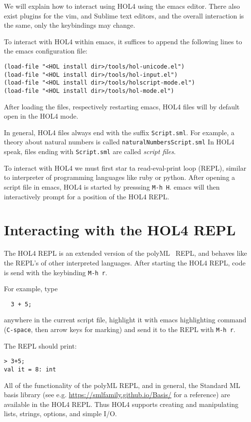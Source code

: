 \documentclass[10pt]{scrartcl}
\newcommand{\ekey}[1]{\texttt{#1}}
\begin{document}
We will explain how to interact using HOL4 using the emacs editor.
There also exist plugins for the vim, and Sublime text editors, and the overall
interaction is the same, only the keybindings may change.

To interact with HOL4 within emacs, it suffices to append the following lines to
the emacs configuration file:
\begin{lstlisting}
(load-file "<HOL install dir>/tools/hol-unicode.el")
(load-file "<HOL install dir>/tools/hol-input.el")
(load-file "<HOL install dir>/tools/holscript-mode.el")
(load-file "<HOL install dir>/tools/hol-mode.el")
\end{lstlisting}

After loading the files, respectively restarting emacs, HOL4 files will by
default open in the HOL4 mode.

In general, HOL4 files always end with the suffix \texttt{Script.sml}.
For example, a theory about natural numbers is called
\texttt{naturalNumbersScript.sml}
In HOL4 speak, files ending with \texttt{Script.sml} are called \emph{script files}.

To interact with HOL4 we must first star ta read-eval-print loop (REPL), similar
to interpreter of programming languages like ruby or python.
After opening a script file in emacs, HOL4 is started by presssing
\ekey{M-h H}.
emacs will then interactively prompt for a position of the HOL4 REPL.

\section{Interacting with the HOL4 REPL}

The HOL4 REPL is an extended version of the polyML~\cite{polymlweb} REPL, and
behaves like the REPL's of other interpreted languages.
After starting the HOL4 REPL, code is send with the keybinding \ekey{M-h r}.

For example, type
\begin{lstlisting}
  3 + 5;
\end{lstlisting}

anywhere in the current script file, highlight it with emacs highlighting
command (\ekey{C-space}, then arrow keys for marking) and send it to the REPL
with \ekey{M-h r}.

The REPL should print:
\begin{lstlisting}[frame=single]
> 3+5;
val it = 8: int
\end{lstlisting}

All of the functionality of the polyML REPL, and in general, the Standard ML
basis library (see e.g. \url{https://smlfamily.github.io/Basis/} for a reference)
are available in the HOL4 REPL.
Thus HOL4 supports creating and manipulating lists, strings, options, and
simple I/O.
\end{document}
